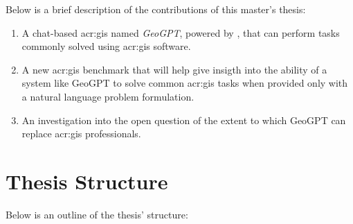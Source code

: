 Below is a brief description of the contributions of this master's thesis:

\begin{enumerate}
    \item A chat-based \acrshort{acr:gis} named \textit{GeoGPT}, powered by , that can perform tasks commonly solved using \acrshort{acr:gis} software.
    \item A new \acrshort{acr:gis} benchmark that will help give insigth into the ability of a system like GeoGPT to solve common \acrshort{acr:gis} tasks when provided only with a natural language problem formulation.
    \item An investigation into the open question of the extent to which GeoGPT can replace \acrshort{acr:gis} professionals.
\end{enumerate}

\section{Thesis Structure}
\label{sec:thesis-structure}

\begin{comment}
This section provides the reader with an overview of what is coming in the next chapters.
You want to say more than what is explicit in the chapter name, if possible, but still keep the description short and to the point. So something along the lines of:

\begin{itemize}
    \item Chapter~\ref{cha:background_theory} introduces the theory, tools and methods necessary to understand the work.
    \item \textit{Lorem ipsum dolor sit amet, consectetur adipiscing elit.}
    \item Chapter~\ref{cha:conclusion} sums up the work and points to ways it can be improved or extended in the future.
\end{itemize}
\end{comment}

Below is an outline of the thesis' structure:

